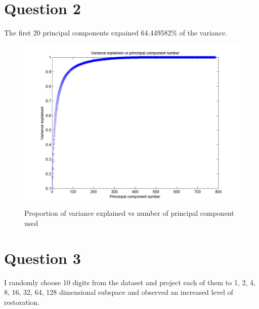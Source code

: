 \documentclass[paper=a4, fontsize=11pt]{scrartcl} %
\numberwithin{equation}{section} %
\numberwithin{figure}{section} %
\numberwithin{table}{section} %
\begin{document}



\section{Question 2}

The first 20 principal components expained 64.449582\% of the variance.

\begin{figure}[H]
  \centering
  \includegraphics[scale=.7]{variance_explained}
  \caption{Proportion of variance explained vs number of principal component used}
\end{figure}



\section {Question 3}

I randomly choose 10 digits from the dataset and project each of them to 1, 2, 4, 8, 16, 32, 64, 128 dimensional subspace and observed an increased level of restoration.
\end{document}
